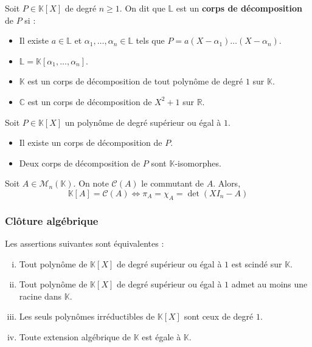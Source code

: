 	\begin{definition}
		Soit $P \in \mathbb{K}[X]$ de degré $n \geq 1$. On dit que $\mathbb{L}$ est un \textbf{corps de décomposition} de $P$ si :
		\begin{itemize}
			\item Il existe $a \in \mathbb{L}$ et $\alpha_1, \dots, \alpha_n \in \mathbb{L}$ tels que $P = a(X-\alpha_1) \dots (X-\alpha_n)$.
			\item $\mathbb{L} = \mathbb{K}[\alpha_1, \dots, \alpha_n]$.
		\end{itemize}
	\end{definition}

	\begin{example}
		\begin{itemize}
			\item $\mathbb{K}$ est un corps de décomposition de tout polynôme de degré $1$ sur $\mathbb{K}$.
			\item $\mathbb{C}$ est un corps de décomposition de $X^2+1$ sur $\mathbb{R}$.
		\end{itemize}
	\end{example}

	\begin{theorem}
		Soit $P \in \mathbb{K}[X]$ un polynôme de degré supérieur ou égal à $1$.
		\begin{itemize}
			\item Il existe un corps de décomposition de $P$.
			\item Deux corps de décomposition de $P$ sont $\mathbb{K}$-isomorphes.
		\end{itemize}
	\end{theorem}


	\begin{application}
		Soit $A \in \mathcal{M}_n(\mathbb{K})$. On note $\mathcal{C}(A)$ le commutant de $A$. Alors,
		\[ \mathbb{K}[A] = \mathcal{C}(A) \iff \pi_A = \chi_A = \det(XI_n - A) \]
	\end{application}

	\subsubsection{Clôture algébrique}


	\begin{proposition}
		\label{125-3}
		Les assertions suivantes sont équivalentes :
		\begin{enumerate}[(i)]
			\item Tout polynôme de $\mathbb{K}[X]$ de degré supérieur ou égal à $1$ est scindé sur $\mathbb{K}$.
			\item Tout polynôme de $\mathbb{K}[X]$ de degré supérieur ou égal à $1$ admet au moins une racine dans $\mathbb{K}$.
			\item Les seuls polynômes irréductibles de $\mathbb{K}[X]$ sont ceux de degré $1$.
			\item Toute extension algébrique de $\mathbb{K}$ est égale à $\mathbb{K}$.
		\end{enumerate}
	\end{proposition}

